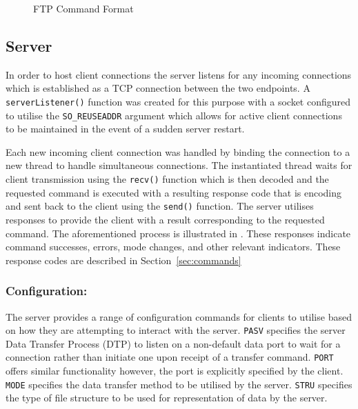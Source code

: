 \documentclass[10pt,twocolumn]{witseiepaper}
\begin{document}
\begin{figure}[h]
	\centering
	\caption{FTP Command Format}
	\label{fig:commandformat}
\end{figure}

\subsection{Server}
In order to host client connections the server listens for any incoming connections which is established as a TCP connection between the two endpoints. A \texttt{serverListener()} function was created for this purpose with a socket configured to utilise the \texttt{SO\_REUSEADDR} argument which allows for active client connections to be maintained in the event of a sudden server restart. 

Each new incoming client connection was handled by binding the connection to a new thread to handle simultaneous connections. The instantiated thread waits for client transmission using the \texttt{recv()} function which is then decoded and the requested command is executed with a resulting response code that is encoding and sent back to the client using the \texttt{send()} function. The server utilises responses to provide the client with a result corresponding to the requested command. The aforementioned process is illustrated in . These responses indicate command successes, errors, mode changes, and other relevant indicators. These response codes are described in Section~\ref{sec:commands}

\subsubsection*{Configuration:}
The server provides a range of configuration commands for clients to utilise based on how they are attempting to interact with the server. \texttt{PASV} specifies the server Data Transfer Process (DTP) to listen on a non-default data port to wait for a connection rather than initiate one upon receipt of a transfer command. \texttt{PORT} offers similar functionality however, the port is explicitly specified by the client. \texttt{MODE} specifies the data transfer method to be utilised by the server. \texttt{STRU} specifies the type of file structure to be used for representation of data by the server.
\end{document}
